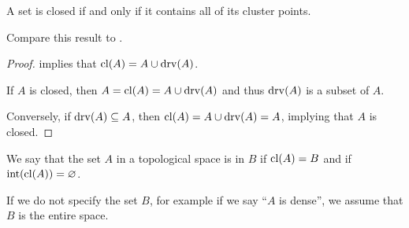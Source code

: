 \begin{corollary}\label{thm:cluster_point_characterization}
  A set is closed if and only if it contains all of its cluster points.
\end{corollary}
\begin{comments}
  \item Compare this result to .
\end{comments}
\begin{proof}
   implies that \( \operatorname{cl}(A) = A \cup \operatorname{drv}(A) \).

  If \( A \) is closed, then \( A = \operatorname{cl}(A) = A \cup \operatorname{drv}(A) \) and thus \( \operatorname{drv}(A) \) is a subset of \( A \).

  Conversely, if \( \operatorname{drv}(A) \subseteq A \), then \( \operatorname{cl}(A) = A \cup \operatorname{drv}(A) = A \), implying that \( A \) is closed.
\end{proof}

\begin{definition}\label{def:topologically_dense_set}
  We say that the set \( A \) in a topological space is  in \( B \) if \( \operatorname{cl}(A) = B \) and  if \( \operatorname{int}(\operatorname{cl}(A)) = \varnothing \).

  If we do not specify the set \( B \), for example if we say \enquote{\( A \) is dense}, we assume that \( B \) is the entire space.
\end{definition}

